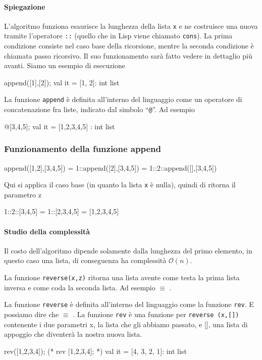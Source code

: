 \documentclass{article}
\newcommand\Omicron{\mathcal{O}}
\begin{document}
\paragraph{Spiegazione}
L'algoritmo funziona esaurisce la lunghezza della lista \texttt{x} e ne costruisce una nuova tramite l'operatore \texttt{::} (quello che in Lisp viene chiamato \texttt{cons}).
La prima condizione consiste nel caso base della ricorsione, mentre la seconda condizione è chiamata passo ricorsivo.
Il suo funzionamento sarà fatto vedere in dettaglio più avanti. Siamo un esempio di esecuzione
\begin{smlcode}
append([1],[2]);
val it = [1, 2]: int list
\end{smlcode}
La funzione \texttt{append} è definita all'interno del linguaggio come un operatore di concatenazione fra liste, indicato dal simbolo ``\texttt{@}''.
Ad esempio
\begin{smlcode}
[1,2]@[3,4,5];
val it = [1,2,3,4,5] : int list
\end{smlcode}

\subsubsection{Funzionamento della funzione append}

\begin{smlcode}
        append([1,2],[3,4,5])
=    1::append([2],[3,4,5])
= 1::2::append([],[3,4,5])
\end{smlcode}
Qui si applica il caso base (in quanto la lista \texttt{x} è nulla), quindi di ritorna il parametro z
\begin{smlcode}
  1::2::[3,4,5]
= 1::[2,3,4,5]
= [1,2,3,4,5]
\end{smlcode}
\paragraph{Studio della complessità}
Il costo dell'algoritmo dipende solamente dalla lunghezza del primo elemento, in questo caso una lista, di conseguenza ha complessità \(\Omicron(n)\).

La funzione \texttt{reverse(x,z)} ritorna una lista avente come testa la prima lista inversa e come coda la seconda lista.
Ad esempio  \(\equiv\) \smlinline{[4,3,2,1]}.

La funzione \texttt{reverse} è definita all'interno del linguaggio come la funzione \texttt{rev}.
E possiamo dire che  \(\equiv\) .
La funzione \texttt{rev} è una funzione  per \texttt{reverse (x,[])} contenente i due parametri x, la lista che gli abbiamo passato, e [], una lista di appoggio che diventerà la nostra nuova lista.
\begin{smlcode}
rev([1,2,3,4]); (* rev [1,2,3,4]; *)
val it = [4, 3, 2, 1]: int list
\end{smlcode}
\end{document}
